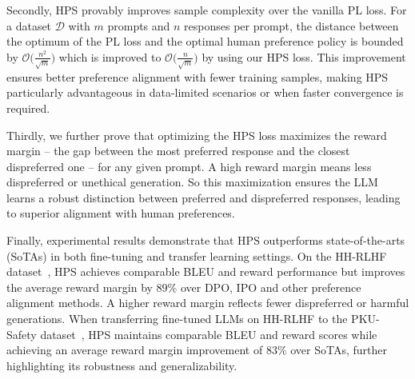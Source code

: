 Secondly, HPS provably improves sample complexity over the vanilla PL loss. For a dataset \(\mathcal{D}\) with \(m\) prompts and \(n\) responses per prompt, the distance between the optimum  of the PL loss and the optimal human preference policy  is bounded by  $\mathcal{O}\big(\frac{n^{2}}{\sqrt{m}}\big)$ which is  improved to $\mathcal{O}\big(\frac{n}{\sqrt{m}}\big)$ by  using our HPS loss. This improvement ensures better preference alignment with fewer training samples, making HPS particularly advantageous in data-limited scenarios or when faster convergence is required.


Thirdly,  we further prove that optimizing the HPS loss maximizes the reward margin -- the gap between the most preferred response and the closest dispreferred one -- for any given prompt. A high reward margin means less  dispreferred  or unethical generation.  So this maximization ensures the LLM learns a robust distinction between preferred and dispreferred responses, leading to superior alignment with human preferences.
 
 

Finally, experimental results demonstrate that HPS outperforms state-of-the-arts (SoTAs) in both fine-tuning and transfer learning settings. On the HH-RLHF dataset~\cite{hhdata}, HPS achieves comparable BLEU and reward performance but improves the average reward margin by $89\%$ over DPO, IPO and other preference alignment methods. A higher reward margin reflects fewer dispreferred or harmful generations. When transferring fine-tuned LLMs on HH-RLHF to the PKU-Safety dataset~\cite{pkusafe}, HPS maintains comparable BLEU and reward scores while achieving an average reward margin improvement of $83\%$ over SoTAs, further highlighting its robustness and generalizability.
